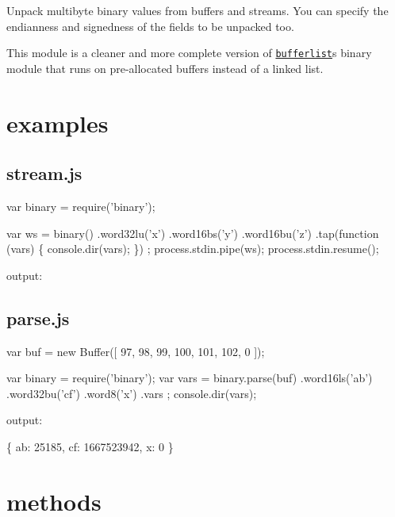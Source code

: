 Unpack multibyte binary values from buffers and streams. You can specify the endianness and signedness of the fields to be unpacked too.

This module is a cleaner and more complete version of \href{https://github.com/substack/node-bufferlist}{\tt bufferlist}\textquotesingle{}s binary module that runs on pre-\/allocated buffers instead of a linked list.

\href{http://travis-ci.org/substack/node-binary}{\tt }

\section*{examples }

\subsection*{stream.\+js }


\begin{DoxyCode}
var binary = require('binary');

var ws = binary()
    .word32lu('x')
    .word16bs('y')
    .word16bu('z')
    .tap(function (vars) \{
        console.dir(vars);
    \})
;
process.stdin.pipe(ws);
process.stdin.resume();
\end{DoxyCode}


output\+:




\subsection*{parse.\+js }


\begin{DoxyCode}
var buf = new Buffer([ 97, 98, 99, 100, 101, 102, 0 ]);

var binary = require('binary');
var vars = binary.parse(buf)
    .word16ls('ab')
    .word32bu('cf')
    .word8('x')
    .vars
;
console.dir(vars);
\end{DoxyCode}


output\+:


\begin{DoxyCode}
\{ ab: 25185, cf: 1667523942, x: 0 \}
\end{DoxyCode}


\section*{methods }

